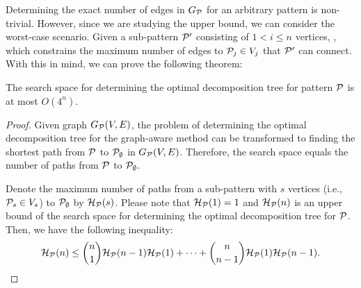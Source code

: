 Determining the exact number of edges in $G_{\mathcal{P}}$ for an arbitrary pattern is non-trivial. However, since we are studying the upper bound, we can consider the worst-case scenario. Given a sub-pattern $\mathcal{P}'$ consisting of $1 < i \leq n$ vertices, , which constrains the maximum number of edges to $\mathcal{P}_j \in V_j$ that $\mathcal{P}'$ can connect.
With this in mind, we can prove the following theorem:

\begin{theorem} \label{thm:complexity-of-graph-aware}
The search space for determining the optimal decomposition tree for pattern $\mathcal{P}$ is at most $O(4^n)$.
\end{theorem}

\begin{proof}
    Given graph $G_{\mathcal{P}}(V, E)$, the problem of determining the optimal decomposition tree for the graph-aware method can be transformed to finding the shortest path from $\mathcal{P}$ to $\mathcal{P}_{\emptyset}$ in $G_{\mathcal{P}}(V, E)$.
    Therefore, the search space equals the number of paths from $\mathcal{P}$ to $\mathcal{P}_{\emptyset}$.
        
    Denote the maximum number of paths from a sub-pattern with $s$ vertices (i.e., $\mathcal{P}_s \in V_s$) to $\mathcal{P}_{\emptyset}$ by $\mathcal{H}_{\mathcal{P}}(s)$.
    Please note that $\mathcal{H}_{\mathcal{P}}(1) = 1$ and $\mathcal{H}_{\mathcal{P}}(n)$ is an upper bound of the search space for determining the optimal decomposition tree for $\mathcal{P}$.
    Then, we have the following inequality:
    \begin{equation*}
        \mathcal{H}_{\mathcal{P}}(n) \leq \binom{n}{1}\mathcal{H}_{\mathcal{P}}(n-1)\mathcal{H}_{\mathcal{P}}(1) + \cdots + \binom{n}{n-1}\mathcal{H}_{\mathcal{P}}(1)\mathcal{H}_{\mathcal{P}}(n-1).
    \end{equation*}
    

\end{proof}
